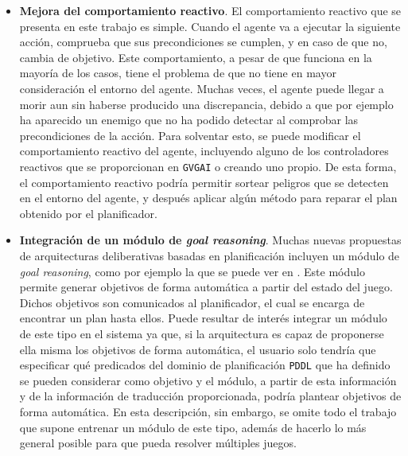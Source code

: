 \begin{itemize}[label=\textbullet]
    \item \textbf{Mejora del comportamiento reactivo}. El comportamiento reactivo que se
    presenta en este trabajo es simple. Cuando el agente va a ejecutar la siguiente acción,
    comprueba que sus precondiciones se cumplen, y en caso de que no, cambia de objetivo.
    Este comportamiento, a pesar de que funciona en la mayoría de los casos, tiene el problema
    de que no tiene en mayor consideración el entorno del agente. Muchas veces, el agente
    puede llegar a morir aun sin haberse producido una discrepancia, debido a que por ejemplo
    ha aparecido un enemigo que no ha podido detectar al comprobar las precondiciones de la acción.
    Para solventar esto, se puede modificar el comportamiento reactivo del agente, incluyendo alguno
    de los controladores reactivos que se proporcionan en \texttt{GVGAI} o creando uno propio. De esta
    forma, el comportamiento reactivo podría permitir sortear peligros que se detecten en el entorno
    del agente, y después aplicar algún método para reparar el plan obtenido por el planificador.
    \item \textbf{Integración de un módulo de \textit{goal reasoning}}. Muchas nuevas propuestas de
    arquitecturas deliberativas basadas en planificación incluyen un módulo de \textit{goal reasoning},
    como por ejemplo la que se puede ver en \cite{Aha_2018}. Este módulo permite generar objetivos
    de forma automática a partir del estado del juego. Dichos objetivos son comunicados al planificador,
    el cual se encarga de encontrar un plan hasta ellos. Puede resultar de interés integrar un módulo
    de este tipo en el sistema ya que, si la arquitectura es capaz de proponerse ella misma los objetivos
    de forma automática, el usuario solo tendría que especificar qué predicados del dominio de planificación
    \texttt{PDDL} que ha definido se pueden considerar como objetivo y el módulo, a partir de esta
    información y de la información de traducción proporcionada, podría plantear objetivos de forma automática.
    En esta descripción, sin embargo, se omite todo el trabajo que supone entrenar un módulo de este
    tipo, además de hacerlo lo más general posible para que pueda resolver múltiples juegos.
\end{itemize}